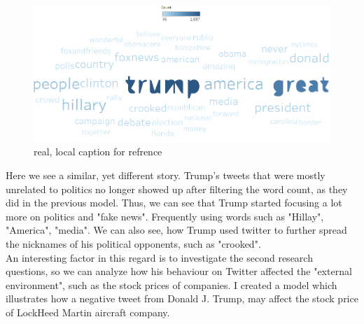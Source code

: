 \documentclass[11pt]{article}
\begin{document}
\begin{figure}[H] %
	\centering %
\includegraphics [scale= .45]  {TrumpAfterAnnouncement}    %
	\caption[Optional caption] {real, local caption for refrence}
	\label{fig:wordcloudBliz}

\end{figure}

Here we see a similar, yet different story. Trump's tweets that were mostly unrelated to politics no longer showed up after filtering the word count, as they did in the previous model. Thus, we can see that Trump started focusing a lot more on politics and "fake news". Frequently using words such as "Hillay", "America", "media". We can also see, how Trump used twitter to further spread the nicknames of his political opponents, such as "crooked". \\

An interesting factor in this regard is to investigate the second research questions, so we can analyze how his behaviour on Twitter affected the "external environment", such as the stock prices of companies.  I created a model which illustrates how a negative tweet from Donald J. Trump, may affect the stock price of LockHeed Martin aircraft company.
\end{document}
